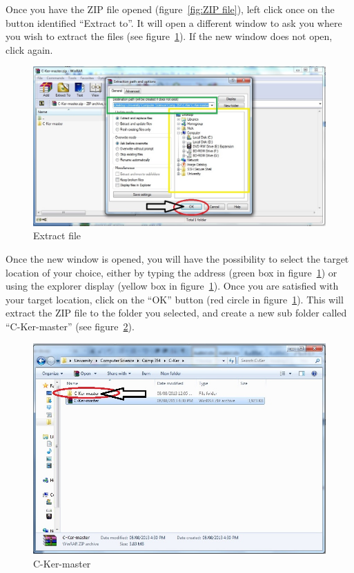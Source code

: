 \documentclass[12pt]{article}
\begin{document}
Once you have the ZIP file opened (figure~\ref{fig:ZIP file}), left click once on the button identified “Extract to”. It will open a different window to ask you where you wish to extract the files (see figure~\ref{fig:Extract file}). If the new window does not open, click again.
\begin{figure}[h!]
    \centering
    \includegraphics[scale=1]{insta5}
    \caption{Extract file}
    \label{fig:Extract file}
\end{figure}\par

Once the new window is opened, you will have the possibility to select the target location of your choice, either by typing the address (green box in figure~\ref{fig:Extract file}) or using the explorer display (yellow box in figure~\ref{fig:Extract file}). Once you are satisfied with your target location, click on the “OK” button (red circle in figure~\ref{fig:Extract file}). This will extract the ZIP file to the folder you selected, and create a new sub folder called “C-Ker-master” (see figure~\ref{fig:C-Ker-master}). 
\begin{figure}[h!]
    \centering
    \includegraphics[scale=1]{insta6}
    \caption{C-Ker-master}
    \label{fig:C-Ker-master}
\end{figure}\par
\end{document}
